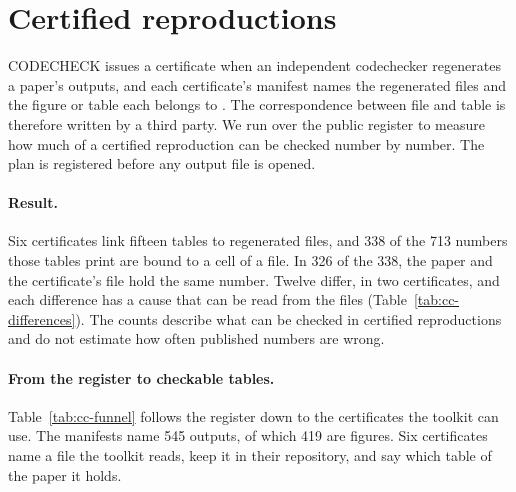 
\section{Certified reproductions}
\label{sec:codecheck}

CODECHECK issues a certificate when an independent codechecker regenerates a paper's outputs, and
each certificate's manifest names the regenerated files and the figure or table each belongs to
\citep{nust2021codecheck}. The correspondence between file and table
is therefore written by a third party. We run \tVerifyCmd{} over the public register to measure
how much of a certified reproduction can be checked number by number. The plan is registered
before any output file is opened.

\paragraph{Result.} Six certificates link fifteen tables to regenerated files, and 338 of the
713 numbers those tables print are bound to a cell of a file. In 326 of the 338, the paper and the
certificate's file hold the same number. Twelve differ, in two certificates, and each difference
has a cause that can be read from the files (Table~\ref{tab:cc-differences}). The counts describe
what can be checked in certified reproductions and do not estimate how often published numbers
are wrong.

\paragraph{From the register to checkable tables.} Table~\ref{tab:cc-funnel} follows the
register down to the certificates the toolkit can use. The manifests name 545 outputs, of which
419 are figures. Six certificates name a file the toolkit reads, keep it in their repository,
and say which table of the paper it holds.


